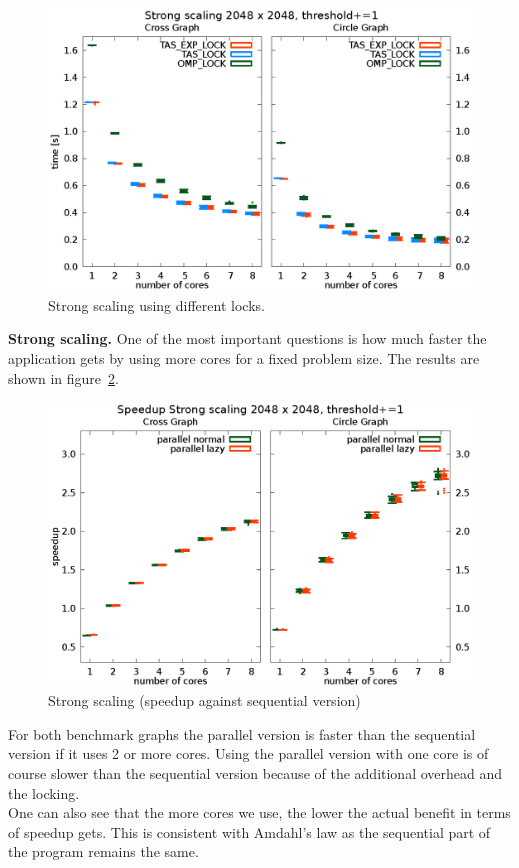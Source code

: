\documentclass[letterpaper]{article}
\newcommand{\mypar}[1]{{\bf #1.}}
\begin{document}
\begin{figure}[h]\centering
  \includegraphics[scale=0.558]{lock_benchmark.eps}
  \caption{Strong scaling using different locks.\label{fig:lock_bench}}
\end{figure}


\mypar{Strong scaling}
One of the most important questions is how much faster the application gets by using more cores for a fixed problem size. The results are shown in figure~\ref{fig:strong_scaling}.
\begin{figure}[h]\centering
  \includegraphics[scale=0.558]{strong_scaling_speedup.eps}
  \caption{Strong scaling (speedup against sequential version) \label{fig:strong_scaling}}
\end{figure}
For both benchmark graphs the parallel version is faster than the sequential version if it uses 2 or more cores. Using the parallel version with one core is of course slower than the sequential version  because of the additional overhead and the locking.\\
One can also see that the more cores we use, the lower the actual benefit in terms of speedup gets. This is consistent with Amdahl's law as the sequential part of the program remains the same.
\end{document}
